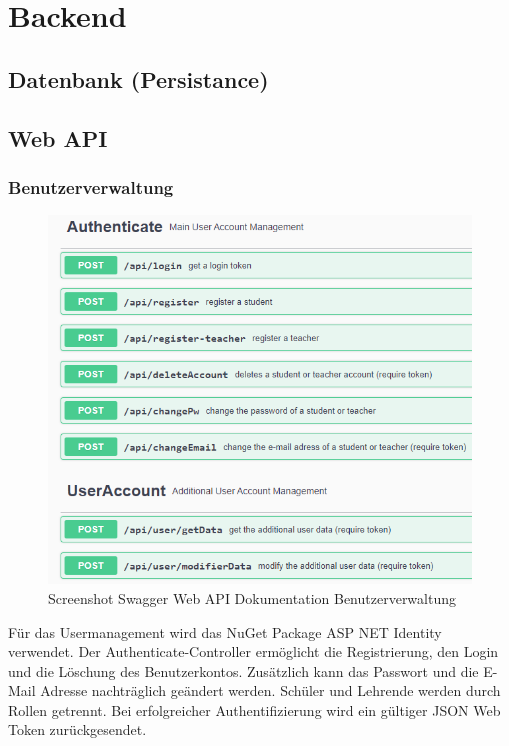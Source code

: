 \section{Backend}
\author{Stefano Pyringer}

\subsection{Datenbank (Persistance)}
\author{Stefano Pyringer}


\newpage

\subsection{Web API}
\author{Stefano Pyringer}

\subsubsection{Benutzerverwaltung}
\author{Stefano Pyringer}

\begin{figure}[h]
    \includegraphics*[width=15cm]{./pics/Screenshot_Swagger_Auth.png}
    \caption[Swagger Benutzerverwaltung]{Screenshot Swagger Web API Dokumentation Benutzerverwaltung}
\end{figure}

Für das Usermanagement wird das NuGet Package ASP NET Identity verwendet. Der Authenticate-Controller ermöglicht die Registrierung, den Login und die Löschung des Benutzerkontos. 
Zusätzlich kann das Passwort und die E-Mail Adresse nachträglich geändert werden. Schüler und Lehrende werden durch Rollen getrennt.
Bei erfolgreicher Authentifizierung wird ein gültiger JSON Web Token zurückgesendet. 


